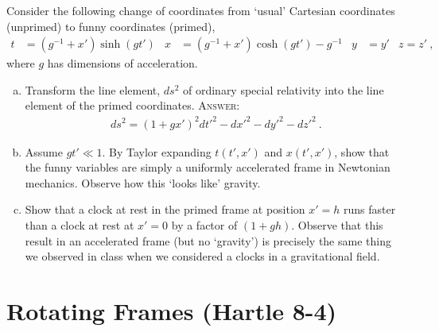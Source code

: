 \documentclass[12pt]{article}
\numberwithin{equation}{section}    %
\begin{document}
Consider the following change of coordinates from `usual' Cartesian coordinates (unprimed) to funny coordinates (primed),
\begin{align}
	t&= 
	\left(g^{-1} + x'\right)\sinh\left(gt'\right)
	&
	x &= 
	\left(g^{-1} + x'\right)\cosh\left(gt'\right) - g^{-1}
	&
	y&=y'
	&
	z=z' \ ,
\end{align}
where $g$ has dimensions of acceleration.
\begin{enumerate}[(a)]
	\item Transform the line element, $ds^2$ of ordinary special relativity into the line element of the primed coordinates. \textsc{Answer}: 
	\begin{align}
		ds^2 = \left(1+gx'\right)^2 dt'^2 - dx'^2 - dy'^2 - dz'^2 \ .
	\end{align}
	\item Assume $gt' \ll 1$. By Taylor expanding $t(t',x')$ and $x(t',x')$, show that the funny variables are simply a uniformly accelerated frame in Newtonian mechanics. Observe how this `looks like' gravity. 
	\item Show that a clock at rest in the primed frame at position $x'=h$ runs faster than a clock at rest at $x'=0$ by a factor of $(1+gh)$. Observe that this result in an accelerated frame (but no `gravity') is precisely the same thing we observed in class when we considered a clocks in a gravitational field. 
\end{enumerate}

\section{Rotating Frames (Hartle 8-4)}
\end{document}
